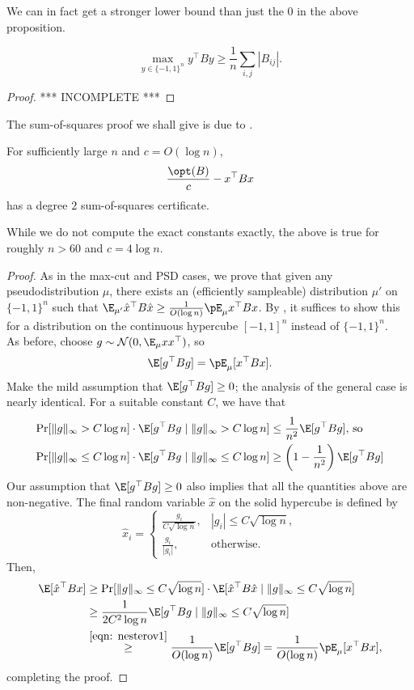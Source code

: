 	We can in fact get a stronger lower bound than just the $0$ in the above proposition.

	\begin{fprop}
		\[ \max_{y \in \{-1,1\}^n} y^\top B y \ge \frac{1}{n} \sum_{i,j} |B_{ij}|. \]
	\end{fprop}
	\begin{proof}
		*** INCOMPLETE ***
	\end{proof}

	The sum-of-squares proof we shall give is due to \cite{quad-optim-meg01,quad-optim-charikar-wirth}.

	\begin{ftheo}
		For sufficiently large $n$ and $c = O(\log n)$,
		\[ \frac{\opt(B)}{c} - x^\top B x \]
		has a degree $2$ sum-of-squares certificate.
	\end{ftheo}
	While we do not compute the exact constants exactly, the above is true for roughly $n > 60$ and $c = 4 \log n$.
	\begin{proof}
		As in the max-cut and PSD cases, we prove that given any pseudodistribution $\mu$, there exists an (efficiently sampleable) distribution $\mu'$ on $\{-1,1\}^n$ such that $\E_{\mu'} \hat{x}^\top B \hat{x} \ge \frac{1}{O(\log n)} \pE_\mu x^\top B x$. By , it suffices to show this for a distribution on the continuous hypercube $[-1,1]^n$ instead of $\{-1,1\}^n$.\\
		As before, choose $g \sim \mathcal{N}(0,\E_\mu xx^\top)$, so
		\[ \E[g^\top B g] = \pE_\mu [x^\top Bx]. \]
		Make the mild assumption that $\E[g^\top B g] \ge 0$; the analysis of the general case is nearly identical. For a suitable constant $C$, we have that
		\begin{align}
			\Pr[\|g\|_\infty > C \log n] \cdot \E[g^\top B g \mid \|g\|_\infty > C \log n] &\le \frac{1}{n^2} \E[g^\top B g] \text{, so} \nonumber \\
			\Pr[\|g\|_\infty \le C \log n] \cdot \E[g^\top B g \mid \|g\|_\infty \le C \log n] &\ge \left( 1 - \frac{1}{n^2} \right) \E[g^\top B g] \label{eqn: nesterov1}
		\end{align}
		Our assumption that $\E[g^\top B g] \ge 0$ also implies that all the quantities above are non-negative.
		The final random variable $\hat{x}$ on the solid hypercube is defined by
		\[ \hat{x}_i = \begin{cases} \frac{g_i}{C\sqrt{\log n}}, & |g_i| \le C\sqrt{\log n}, \\ \frac{g_i}{|g_i|}, & \text{otherwise.} \end{cases} \]
		Then,
		\begin{align*}
			\E[\hat{x}^\top B x] &\ge \Pr[\|g\|_\infty \le C\sqrt{\log n}] \cdot \E[\hat{x}^\top B \hat{x} \mid \|g\|_\infty \le C\sqrt{\log n}] \\
				&\ge \frac{1}{2C^2\log n}\E[g^\top B g \mid \|g\|_\infty \le C\sqrt{\log n}] \\
				&\stackrel{\eqref{eqn: nesterov1}}{\ge} \frac{1}{O(\log n)} \E[g^\top B g] = \frac{1}{O(\log n)} \pE_{\mu}[x^\top B x],
		\end{align*}
		completing the proof.
	\end{proof}


